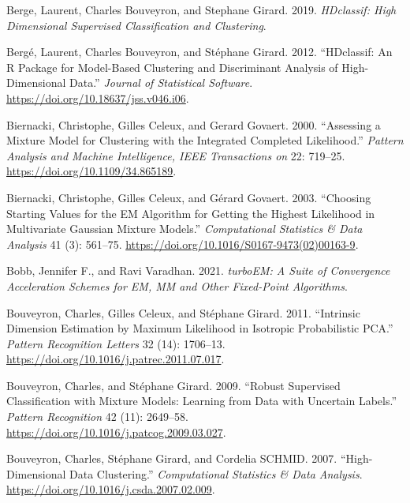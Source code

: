 \begin{CSLReferences}{1}{0}
\leavevmode{}%
Berge, Laurent, Charles Bouveyron, and Stephane Girard. 2019. \emph{HDclassif: High Dimensional Supervised Classification and Clustering}.

\leavevmode{}%
Bergé, Laurent, Charles Bouveyron, and Stéphane Girard. 2012. {``{HDclassif}: {An} {R} {Package} for {Model}-{Based} {Clustering} and {Discriminant} {Analysis} of {High}-{Dimensional} {Data}.''} \emph{Journal of Statistical Software}. \url{https://doi.org/10.18637/jss.v046.i06}.

\leavevmode{}%
Biernacki, Christophe, Gilles Celeux, and Gerard Govaert. 2000. {``Assessing a {Mixture Model} for {Clustering} with the {Integrated Completed Likelihood}.''} \emph{Pattern Analysis and Machine Intelligence, IEEE Transactions on} 22: 719--25. \url{https://doi.org/10.1109/34.865189}.

\leavevmode{}%
Biernacki, Christophe, Gilles Celeux, and Gérard Govaert. 2003. {``Choosing Starting Values for the {EM} Algorithm for Getting the Highest Likelihood in Multivariate {Gaussian} Mixture Models.''} \emph{Computational Statistics \& Data Analysis} 41 (3): 561--75. \url{https://doi.org/10.1016/S0167-9473(02)00163-9}.

\leavevmode{}%
Bobb, Jennifer F., and Ravi Varadhan. 2021. \emph{turboEM: A Suite of Convergence Acceleration Schemes for EM, MM and Other Fixed-Point Algorithms}.

\leavevmode{}%
Bouveyron, Charles, Gilles Celeux, and Stéphane Girard. 2011. {``Intrinsic {Dimension Estimation} by {Maximum Likelihood} in {Isotropic Probabilistic PCA}.''} \emph{Pattern Recognition Letters} 32 (14): 1706--13. \url{https://doi.org/10.1016/j.patrec.2011.07.017}.

\leavevmode{}%
Bouveyron, Charles, and Stéphane Girard. 2009. {``{Robust Supervised Classification} with {Mixture Models}: {Learning} from {Data} with {Uncertain Labels}.''} \emph{Pattern Recognition} 42 (11): 2649--58. \url{https://doi.org/10.1016/j.patcog.2009.03.027}.

\leavevmode{}%
Bouveyron, Charles, Stéphane Girard, and Cordelia SCHMID. 2007. {``High-{Dimensional} {Data} {Clustering}.''} \emph{Computational Statistics \& Data Analysis}. \url{https://doi.org/10.1016/j.csda.2007.02.009}.


\end{CSLReferences}
